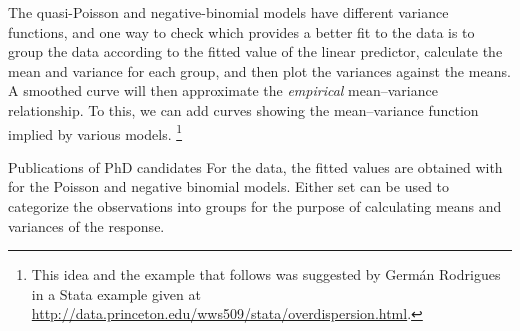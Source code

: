 \documentclass[11pt]{book}\usepackage[]{graphicx}\usepackage[]{color}
\begin{document}
The quasi-Poisson and negative-binomial models have different variance functions, and one way to
check which provides a better fit to the data is to group the data according to the
fitted value of the linear predictor, calculate the mean and variance for each group, and
then plot the variances against the means.
A smoothed curve will then approximate the \emph{empirical} mean--variance relationship.
To this, we can add curves showing the mean--variance function implied by various models.%
\footnote{
This idea and the example that follows was suggested by Germ\'an Rodrigues
in a Stata example given at
\url{http://data.princeton.edu/wws509/stata/overdispersion.html}.
}

\begin{Example}[phdpubs3]{Publications of PhD candidates}
For the  data, the fitted values are obtained with  for the
Poisson and negative binomial models. Either set can be used to categorize the observations
into groups for the purpose of calculating means and variances of the response.





\end{Example}
\end{document}
